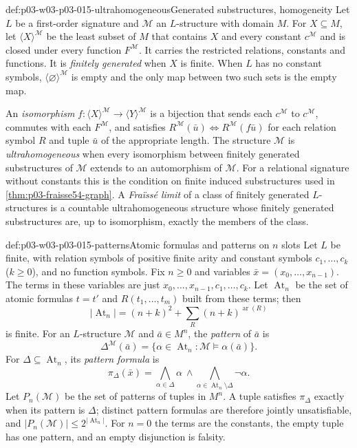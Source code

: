 \begin{hbdefinition}{def:p03-w03-p03-015-ultrahomogeneous}{Generated substructures, homogeneity}
Let \(L\) be a first-order signature and \(\mathcal M\) an
\(L\)-structure with domain \(M\). For \(X\subseteq M\), let
\(\langle X\rangle^{\mathcal M}\) be the least subset of \(M\) that
contains \(X\) and every constant \(c^{\mathcal M}\) and is closed under
every function \(F^{\mathcal M}\). It carries the restricted relations,
constants and functions. It is \emph{finitely generated} when \(X\) is
finite. When \(L\) has no constant symbols, \(\langle\varnothing\rangle^{\mathcal M}\)
is empty and the only map between two such sets is the empty map.

An \emph{isomorphism} \(f:\langle X\rangle^{\mathcal M}\to\langle Y\rangle^{\mathcal M}\)
is a bijection that sends each \(c^{\mathcal M}\) to \(c^{\mathcal M}\),
commutes with each \(F^{\mathcal M}\), and satisfies
\(R^{\mathcal M}(\bar u)\Leftrightarrow R^{\mathcal M}(f\bar u)\) for each
relation symbol \(R\) and tuple \(\bar u\) of the appropriate length.
The structure \(\mathcal M\) is \emph{ultrahomogeneous} when every
isomorphism between finitely generated substructures of \(\mathcal M\)
extends to an automorphism of \(\mathcal M\).
For a relational signature without constants this is the condition on
finite induced substructures used in \cref{thm:p03-fraisse54-graph}.
A \emph{Fra\"iss\'e limit} of a class of finitely generated
\(L\)-structures is a countable ultrahomogeneous structure whose finitely
generated substructures are, up to isomorphism, exactly the members of
the class.
\end{hbdefinition}

\begin{hbdefinition}{def:p03-w03-p03-015-patterns}{Atomic formulas and patterns on \(n\) slots}
Let \(L\) be finite, with relation symbols of positive finite arity and
constant symbols \(c_1,\ldots,c_k\) (\(k\geq0\)), and no function symbols.
Fix \(n\geq0\) and variables \(\bar x=(x_0,\ldots,x_{n-1})\).
The terms in these variables are just \(x_0,\ldots,x_{n-1},c_1,\ldots,c_k\).
Let \(\operatorname{At}_n\) be the set of atomic formulas
\(t=t'\) and \(R(t_1,\ldots,t_m)\) built from these terms; then
\[
 |\operatorname{At}_n|=(n+k)^2+\sum_{R}(n+k)^{\operatorname{ar}(R)}
\]
is finite. For an \(L\)-structure \(\mathcal M\) and
\(\bar a\in M^n\), the \emph{pattern} of \(\bar a\) is
\[
 \Delta^{\mathcal M}(\bar a)=\{\alpha\in\operatorname{At}_n:
              \mathcal M\models\alpha(\bar a)\}.
\]
For \(\Delta\subseteq\operatorname{At}_n\), its \emph{pattern formula} is
\[
 \pi_\Delta(\bar x)=\bigwedge_{\alpha\in\Delta}\alpha\ \land
   \bigwedge_{\alpha\in\operatorname{At}_n\setminus\Delta}\neg\alpha .
\]
Let \(P_n(\mathcal M)\) be the set of patterns of tuples in \(M^n\).
A tuple satisfies \(\pi_\Delta\) exactly when its pattern is \(\Delta\);
distinct pattern formulas are therefore jointly unsatisfiable, and
\(|P_n(\mathcal M)|\leq2^{|\operatorname{At}_n|}\).
For \(n=0\) the terms are the constants, the empty tuple has one
pattern, and an empty disjunction is falsity.
\end{hbdefinition}

